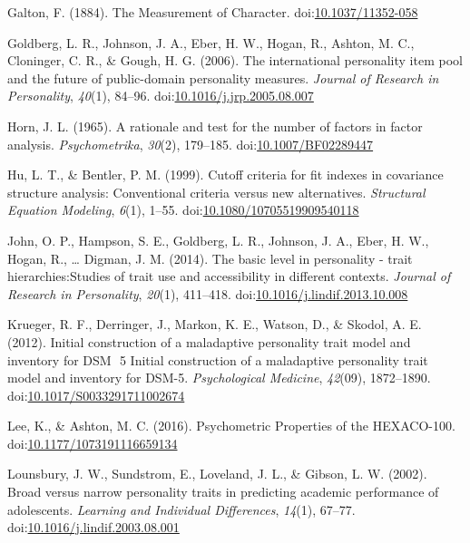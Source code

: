 \documentclass[man]{apa6}
\theoremstyle{definition}
\theoremstyle{definition}
\theoremstyle{definition}
\theoremstyle{remark}
\begin{document}
\leavevmode\hypertarget{ref-Galton1884}{}%
Galton, F. (1884). The Measurement of Character.
doi:\href{https://doi.org/10.1037/11352-058}{10.1037/11352-058}

\leavevmode\hypertarget{ref-Goldberg2006}{}%
Goldberg, L. R., Johnson, J. A., Eber, H. W., Hogan, R., Ashton, M. C.,
Cloninger, C. R., \& Gough, H. G. (2006). The international personality
item pool and the future of public-domain personality measures.
\emph{Journal of Research in Personality}, \emph{40}(1), 84--96.
doi:\href{https://doi.org/10.1016/j.jrp.2005.08.007}{10.1016/j.jrp.2005.08.007}

\leavevmode\hypertarget{ref-Horn1965}{}%
Horn, J. L. (1965). A rationale and test for the number of factors in
factor analysis. \emph{Psychometrika}, \emph{30}(2), 179--185.
doi:\href{https://doi.org/10.1007/BF02289447}{10.1007/BF02289447}

\leavevmode\hypertarget{ref-Hu1999}{}%
Hu, L. T., \& Bentler, P. M. (1999). Cutoff criteria for fit indexes in
covariance structure analysis: Conventional criteria versus new
alternatives. \emph{Structural Equation Modeling}, \emph{6}(1), 1--55.
doi:\href{https://doi.org/10.1080/10705519909540118}{10.1080/10705519909540118}

\leavevmode\hypertarget{ref-Ziegler2014}{}%
John, O. P., Hampson, S. E., Goldberg, L. R., Johnson, J. A., Eber, H.
W., Hogan, R., \ldots{} Digman, J. M. (2014). The basic level in
personality - trait hierarchies:Studies of trait use and accessibility
in different contexts. \emph{Journal of Research in Personality},
\emph{20}(1), 411--418.
doi:\href{https://doi.org/10.1016/j.lindif.2013.10.008}{10.1016/j.lindif.2013.10.008}

\leavevmode\hypertarget{ref-Krueger2012a}{}%
Krueger, R. F., Derringer, J., Markon, K. E., Watson, D., \& Skodol, A.
E. (2012). Initial construction of a maladaptive personality trait model
and inventory for DSM ­ 5 Initial construction of a maladaptive
personality trait model and inventory for DSM-5. \emph{Psychological
Medicine}, \emph{42}(09), 1872--1890.
doi:\href{https://doi.org/10.1017/S0033291711002674}{10.1017/S0033291711002674}

\leavevmode\hypertarget{ref-Lee2016}{}%
Lee, K., \& Ashton, M. C. (2016). Psychometric Properties of the
HEXACO-100.
doi:\href{https://doi.org/10.1177/1073191116659134}{10.1177/1073191116659134}

\leavevmode\hypertarget{ref-Lounsbury2002}{}%
Lounsbury, J. W., Sundstrom, E., Loveland, J. L., \& Gibson, L. W.
(2002). Broad versus narrow personality traits in predicting academic
performance of adolescents. \emph{Learning and Individual Differences},
\emph{14}(1), 67--77.
doi:\href{https://doi.org/10.1016/j.lindif.2003.08.001}{10.1016/j.lindif.2003.08.001}
\end{document}
